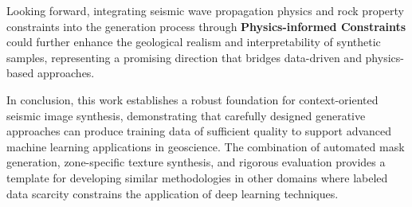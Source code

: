 \documentclass{ieeeaccess}
\begin{document}
Looking forward, integrating seismic wave propagation physics and rock property constraints into the generation process through \textbf{Physics-informed Constraints} could further enhance the geological realism and interpretability of synthetic samples, representing a promising direction that bridges data-driven and physics-based approaches.

In conclusion, this work establishes a robust foundation for context-oriented seismic image synthesis, demonstrating that carefully designed generative approaches can produce training data of sufficient quality to support advanced machine learning applications in geoscience. The combination of automated mask generation, zone-specific texture synthesis, and rigorous evaluation provides a template for developing similar methodologies in other domains where labeled data scarcity constrains the application of deep learning techniques.
\end{document}
